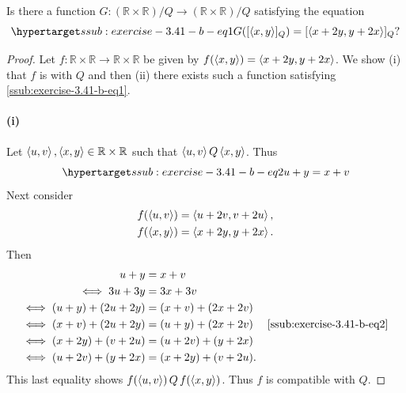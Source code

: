 \documentclass{report}
\begin{document}
\subsubsection{}%

  Is there a function $G \colon (\mathbb{R} \times \mathbb{R}) / Q
    \rightarrow (\mathbb{R} \times \mathbb{R}) / Q$ satisfying the equation
    \begin{equation}
      \hyperlabel{ssub:exercise-3.41-b-eq1}
      G([\tuple{x, y}]_Q) = [\tuple{x + 2y, y + 2x}]_Q?
    \end{equation}

  \begin{proof}
    Let $f \colon \mathbb{R} \times \mathbb{R}
      \rightarrow \mathbb{R} \times \mathbb{R}$ be given by
      $f(\left< x, y \right>) = \left< x + 2y, y + 2x \right>$.
    We show (i) that $f$ is  with $Q$ and then (ii)
      there exists such a function satisfying \eqref{ssub:exercise-3.41-b-eq1}.

    \paragraph{(i)}%

      Let $\left< u, v \right>, \left< x, y \right> \in \mathbb{R} \times \mathbb{R}$ such
        that $\left< u, v \right> Q \left< x, y \right>$.
      Thus
        \begin{equation}
          \hyperlabel{ssub:exercise-3.41-b-eq2}
          u + y = x + v
        \end{equation}
      Next consider
        \begin{align*}
          f(\left< u, v \right>) & = \left< u + 2v, v + 2u \right>, \\
          f(\left< x, y \right>) & = \left< x + 2y, y + 2x \right>.
        \end{align*}
      Then
        \begin{align*}
               u + y & = x + v \\
          \iff 3u + 3y & = 3x + 3v \\
          \iff (u + y) + (2u + 2y) & = (x + v) + (2x + 2v) \\
          \iff (x + v) + (2u + 2y) & = (u + y) + (2x + 2v)
            & \eqref{ssub:exercise-3.41-b-eq2} \\
          \iff (x + 2y) + (v + 2u) & = (u + 2v) + (y + 2x) \\
          \iff (u + 2v) + (y + 2x) & = (x + 2y) + (v + 2u).
        \end{align*}
      This last equality shows $f(\left< u, v \right>) \,Q\, f(\left< x, y \right>)$.
      Thus $f$ is compatible with $Q$.


\end{proof}
\end{document}
